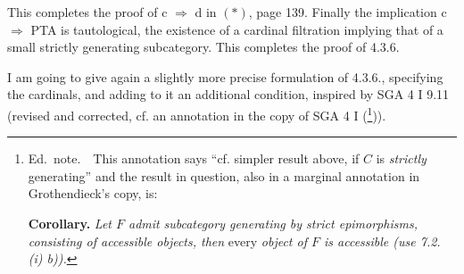 \documentclass[11pt]{article}
\newcommand{\printedpage}[1]{\marginpar{\footnotesize p.~#1}}
\begin{document}
This completes the proof of c $\Longrightarrow$ d in $(*)$, page 139. Finally the implication c $\Longrightarrow$ PTA is tautological, the existence of a cardinal filtration implying that of a small strictly generating subcategory. This completes the proof of 4.3.6.

I am going to give again a slightly more precise formulation of 4.3.6., specifying the cardinals, and adding to it an additional condition, inspired by SGA 4 I 9.11 (revised and corrected, cf. an annotation in the copy of SGA 4 I (\footnote[58]{Ed.~note.\ \ This annotation says ``cf. simpler result above, if $C$ is \textit{strictly} generating'' and
the result in question, also in a marginal annotation in Grothendieck's copy, is:\par
\textbf{Corollary.} \textit{Let $F$ admit} \textit{subcategory generating by strict epimorphisms, consisting of accessible objects, then} every \textit{object of $F$ is accessible (use 7.2. (i) b)).}})).

\printedpage{48}
\end{document}
